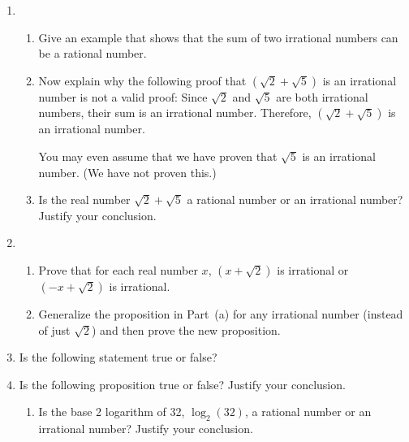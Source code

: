 \begin{enumerate}
\item \begin{enumerate}
\item Give an example that shows that the sum of two irrational numbers can be a rational number.

\item Now explain why the following proof that $\left( \sqrt{2} + \sqrt{5} \right)$ is an irrational number is not a valid proof:  Since $\sqrt{2}$ and $\sqrt{5}$ are both irrational numbers, their sum is an irrational number.  Therefore, 
$\left( \sqrt{2} + \sqrt{5} \right)$ is an irrational number.

\note  You may even assume that we have proven that $\sqrt{5}$ is an irrational number.  (We have not proven this.)

\item Is the real number $\sqrt 2  + \sqrt 5 $ a rational number or  an irrational number?  Justify your conclusion.
\label{exer:sec33-10}%
\end{enumerate}

\item \begin{enumerate}
\item Prove that for each real number $x$, $\left(x + \sqrt{2} \right)$ is irrational or 
$\left(-x + \sqrt{2} \right)$ is irrational.

\item Generalize the proposition in Part~(a) for any irrational number (instead of just 
$\sqrt{2}$) and then prove the new proposition.
\end{enumerate}

\item Is the following statement true or false?
%
        

\item Is the following proposition true or false?  Justify your conclusion.




\xitem \begin{enumerate}
  \item Is the base 2 logarithm of 32, $\log _2 (32)$,  a rational number or an irrational number? Justify your conclusion. 


\end{enumerate}
\end{enumerate}
